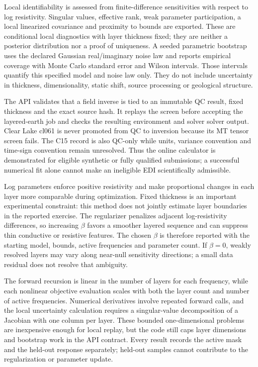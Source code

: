 Local identifiability is assessed from finite-difference sensitivities
with respect to log resistivity. Singular values, effective rank, weak
parameter participation, a local linearized covariance and proximity to
bounds are exported. These are conditional local diagnostics with layer
thickness fixed; they are neither a posterior distribution nor a proof
of uniqueness. A seeded parametric bootstrap uses the declared Gaussian
real/imaginary noise law and reports empirical coverage with Monte Carlo
standard error and Wilson intervals. Those intervals quantify this
specified model and noise law only. They do not include uncertainty in
thickness, dimensionality, static shift, source processing or geological
structure.

The API validates that a field inverse is tied to an immutable QC result,
fixed thickness and the exact source hash. It replays the screen before
accepting the layered-earth job and checks the resulting environment and solver
solver output. Clear Lake cl061 is never promoted from QC to inversion because
its MT tensor screen fails. The C15 record is also QC-only while units,
variance convention and time-sign convention remain unresolved. Thus
the online calculator is demonstrated for eligible synthetic or fully
qualified submissions; a successful numerical fit alone cannot make an
ineligible EDI scientifically admissible.

Log parameters enforce positive resistivity and make proportional
changes in each layer more comparable during optimization. Fixed
thickness is an important experimental constraint: this method does not
jointly estimate layer boundaries in the reported exercise. The
regularizer penalizes adjacent log-resistivity differences, so increasing
\(\beta\) favors a smoother layered sequence and can suppress thin
conductive or resistive features. The chosen \(\beta\) is therefore
reported with the starting model, bounds, active frequencies and
parameter count. If \(\beta=0\), weakly resolved layers may vary along
near-null sensitivity directions; a small data residual does not resolve
that ambiguity.

The forward recursion is linear in the number of layers for each
frequency, while each nonlinear objective evaluation scales with both
the layer count and number of active frequencies. Numerical derivatives
involve repeated forward calls, and the local uncertainty calculation
requires a singular-value decomposition of a Jacobian with one column
per layer. These bounded one-dimensional problems are inexpensive enough
for local replay, but the code still caps layer dimensions and bootstrap
work in the API contract. Every result records the active mask and the
held-out response separately; held-out samples cannot contribute to the
regularization or parameter update.


